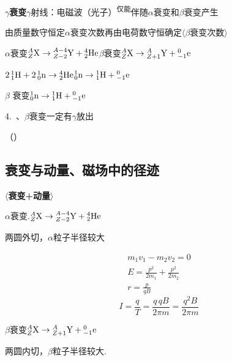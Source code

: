 \textbf{$\gamma$衰变}\quad $\gamma$射线：电磁波（光子）\textsuperscript{仅能}伴随$\alpha$衰变和$\beta$衰变产生

由质量数守恒定$\alpha$衰变次数\quad 再由电荷数守恒确定$\langle$$\beta$衰变次数$\rangle$ %

\noindent $\alpha$衰变\quad ${}^{A}_{Z}\mathrm{X}\to{}^{A-4}_{Z-2}\mathrm{Y}+{}^{4}_{2}\mathrm{He}$\qquad $\beta$衰变\quad ${}^{A}_{Z}\mathrm{X}\to{}^{A}_{Z+1}\mathrm{Y}+{}^{0}_{-1}\mathrm{e}$

\noindent $2\,{}^{1}_{1}\mathrm{H}+2\,{}^{1}_{0}\mathrm{n}\to{}^{4}_{2}\mathrm{He}$\qquad ${}^{1}_{0}\mathrm{n}\to{}^{1}_{1}\mathrm{H}+{}^{0}_{-1}\mathrm{e}$ %

$\beta$ 衰变\quad ${}^{1}_{0}\mathrm{n}\to{}^{1}_{1}\mathrm{H}+{}^{0}_{-1}\mathrm{e}$

4.\ \unclear{$\alpha$}、$\beta$衰变一定有$\gamma$放出

{\small （）} %

\subsection{衰变与动量、磁场中的径迹}
\textbf{$\langle$衰变+动量$\rangle$} %

\noindent $\alpha$衰变.\quad ${}^{A}_{Z}\mathrm{X}\to{}^{A-4}_{Z-2}\mathrm{Y}+{}^{4}_{2}\mathrm{He}$\quad {} %

两圆外切，$\alpha$粒子半径较大

\begin{gather*}
m_1v_1-m_2v_2=0\\
E=\frac{p^2}{2m_1}+\frac{p^2}{2m_2}\\
r=\frac{p}{qB}
\end{gather*}
\[
I=\frac{q}{T}=\frac{q\,qB}{2\pi m}=\frac{q^2B}{2\pi m}
\]

\noindent $\beta$衰变\quad ${}^{A}_{Z}\mathrm{X}\to{}^{A}_{Z+1}\mathrm{Y}+{}^{0}_{-1}\mathrm{e}$\quad {} %

两圆内切，$\beta$粒子半径较大.


